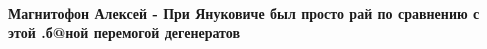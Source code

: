  
 
 
 
 
\paragraph{Магнитофон Алексей - При Януковиче был просто рай по сравнению с этой .б@ной перемогой дегенератов}
\label{sec:26_08_2018.fb.artem_valerievich.1.gaslo_slava_ukraine.cmt.magnitofon_aleksej_janukovich_raj}

